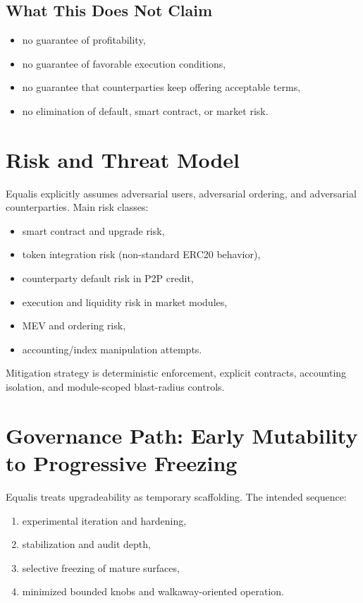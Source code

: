 \documentclass[version=preprint]{iacrcc}
\begin{document}
\subsection{What This Does Not Claim}

\begin{itemize}
  \item no guarantee of profitability,
  \item no guarantee of favorable execution conditions,
  \item no guarantee that counterparties keep offering acceptable terms,
  \item no elimination of default, smart contract, or market risk.
\end{itemize}

\section{Risk and Threat Model}

Equalis explicitly assumes adversarial users, adversarial ordering, and adversarial counterparties. Main risk classes:
\begin{itemize}
  \item smart contract and upgrade risk,
  \item token integration risk (non-standard ERC20 behavior),
  \item counterparty default risk in P2P credit,
  \item execution and liquidity risk in market modules,
  \item MEV and ordering risk,
  \item accounting/index manipulation attempts.
\end{itemize}

Mitigation strategy is deterministic enforcement, explicit contracts, accounting isolation, and module-scoped blast-radius controls.

\section{Governance Path: Early Mutability to Progressive Freezing}

Equalis treats upgradeability as temporary scaffolding. The intended sequence:
\begin{enumerate}
  \item experimental iteration and hardening,
  \item stabilization and audit depth,
  \item selective freezing of mature surfaces,
  \item minimized bounded knobs and walkaway-oriented operation.
\end{enumerate}
\end{document}
